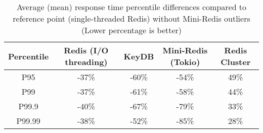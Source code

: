 \begin{table}
    \centering
    \begin{tabular}{c|cccc}
        \toprule
        Percentile & Redis (I/O threading) & KeyDB & Mini-Redis (Tokio) & Redis Cluster \\
        \midrule
               P95 &  -37\% &  -60\% &               -54\% &           49\% \\
               P99 &  -37\% &  -61\% &               -58\% &           44\% \\
             P99.9 &  -40\% &  -67\% &               -79\% &           33\% \\
            P99.99 &  -38\% &  -52\% &               -85\% &           28\% \\
        \bottomrule
    \end{tabular}
    \caption{Average (mean) response time percentile differences compared to reference point (single-threaded Redis) without Mini-Redis outliers (Lower percentage is better)}
    \label{tbl:table_avg_latency_out}
\end{table}